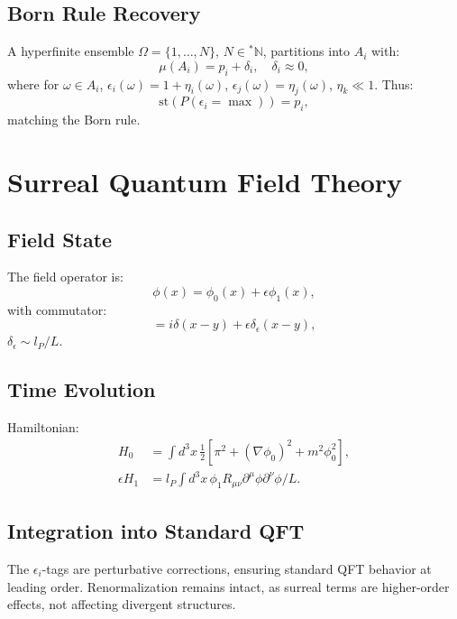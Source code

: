 \documentclass{article}
\begin{document}
\subsection{Born Rule Recovery}
A hyperfinite ensemble \(\Omega = \{1, \dots, N\}\), \(N \in {}^*\mathbb{N}\), partitions into \(A_i\) with:
\begin{equation}
\mu(A_i) = p_i + \delta_i, \quad \delta_i \approx 0,
\end{equation}
where for \(\omega \in A_i\), \(\epsilon_i(\omega) = 1 + \eta_i(\omega)\), \(\epsilon_j(\omega) = \eta_j(\omega)\), \(\eta_k \ll 1\). Thus:
\begin{equation}
\text{st}(P(\epsilon_i = \max)) = p_i,
\end{equation}
matching the Born rule.

\section{Surreal Quantum Field Theory}
\subsection{Field State}
The field operator is:
\begin{equation}
\phi(x) = \phi_0(x) + \epsilon \phi_1(x),
\end{equation}
with commutator:
\begin{equation}
[\phi(x), \pi(y)] = i \delta(x-y) + \epsilon \delta_\epsilon(x-y),
\end{equation}
\(\delta_\epsilon \sim l_P / L\).

\subsection{Time Evolution}
Hamiltonian:
\begin{align}
H_0 &= \int d^3x \, \frac{1}{2} [\pi^2 + (\nabla \phi_0)^2 + m^2 \phi_0^2], \\
\epsilon H_1 &= l_P \int d^3x \, \phi_1 R_{\mu\nu} \partial^\mu \phi \partial^\nu \phi / L.
\end{align}

\subsection{Integration into Standard QFT}
The \(\epsilon_i\)-tags are perturbative corrections, ensuring standard QFT behavior at leading order. Renormalization remains intact, as surreal terms are higher-order effects, not affecting divergent structures.
\end{document}
